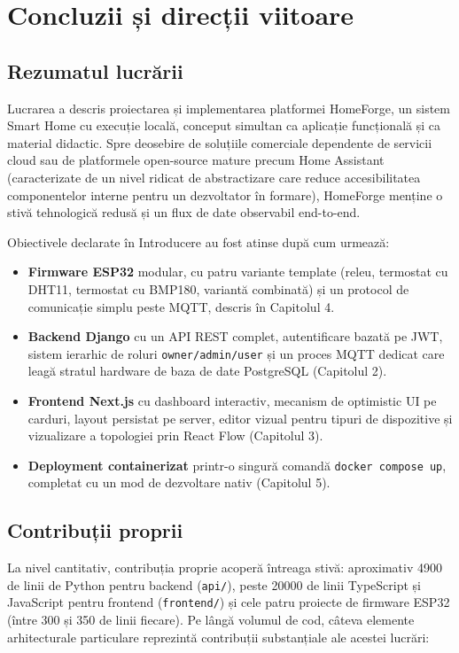 \chapter*{Concluzii și direcții viitoare}

\section*{Rezumatul lucrării}
Lucrarea a descris proiectarea și implementarea platformei HomeForge, un sistem Smart Home cu execuție locală, conceput simultan ca aplicație funcțională și ca material didactic. Spre deosebire de soluțiile comerciale dependente de servicii cloud sau de platformele open-source mature precum Home Assistant (caracterizate de un nivel ridicat de abstractizare care reduce accesibilitatea componentelor interne pentru un dezvoltator în formare), HomeForge menține o stivă tehnologică redusă și un flux de date observabil end-to-end.

Obiectivele declarate în Introducere au fost atinse după cum urmează:
\begin{itemize}
    \item \textbf{Firmware ESP32} modular, cu patru variante template (releu, termostat cu DHT11, termostat cu BMP180, variantă combinată) și un protocol de comunicație simplu peste MQTT, descris în Capitolul 4.
    \item \textbf{Backend Django} cu un API REST complet, autentificare bazată pe JWT, sistem ierarhic de roluri \texttt{owner/admin/user} și un proces MQTT dedicat care leagă stratul hardware de baza de date PostgreSQL (Capitolul 2).
    \item \textbf{Frontend Next.js} cu dashboard interactiv, mecanism de optimistic UI pe carduri, layout persistat pe server, editor vizual pentru tipuri de dispozitive și vizualizare a topologiei prin React Flow (Capitolul 3).
    \item \textbf{Deployment containerizat} printr-o singură comandă \texttt{docker compose up}, completat cu un mod de dezvoltare nativ (Capitolul 5).
\end{itemize}

\section*{Contribuții proprii}
La nivel cantitativ, contribuția proprie acoperă întreaga stivă: aproximativ 4900 de linii de Python pentru backend (\texttt{api/}), peste 20000 de linii TypeScript și JavaScript pentru frontend (\texttt{frontend/}) și cele patru proiecte de firmware ESP32 (între 300 și 350 de linii fiecare). Pe lângă volumul de cod, câteva elemente arhitecturale particulare reprezintă contribuții substanțiale ale acestei lucrări:

